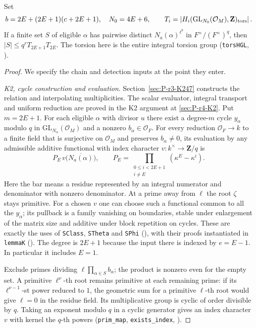 \begin{proposition}\label{prop:P-k-few}
Set
\[
 b=2E+(2E+1)(c+2E+1),\quad N_0=4E+6,\qquad
 T_i=\left|H_i(\mathrm{GL}_{N_0}(\mathcal O_M),\mathbf Z)_{\rm tors}\right|.
\]
If a finite set $S$ of eligible $\alpha$ has pairwise distinct
$N_a(\alpha)^{\ell^b}$ in $F^\times/(F^\times)^q$, then
$|S|\le q^r T_{2E+1}T_{2E}$. The torsion here is the entire integral
torsion group (\nolinkurl{torsHGL}, ).
\end{proposition}
\begin{proof}
We specify the chain and detection inputs at the point they enter.

\emph{K2, cycle construction and evaluation.} Section~\ref{sec:P-r3-K247} constructs the relation and interpolating multiplicities. The scalar evaluator, integral transport and uniform reduction are proved in the K2 argument at \ref{sec:P-r4-K2}.
Put $m=2E+1$. For each eligible $\alpha$ with divisor $u$ there
exist a degree-$m$ cycle $y_\alpha$ modulo $q$ in
$\mathrm{GL}_{N_\alpha}(\mathcal O_M)$ and a nonzero
$b_\alpha\in\mathcal O_F$. For every reduction $\mathcal O_F\to k$ to a
finite field that is surjective on $\mathcal O_M$ and preserves
$b_\alpha\ne0$, its evaluation by any admissible additive functional
with index character $v:k^\times\to\mathbf Z/q$ is
\[
  P_E\,v\big(\overline{N_a(\alpha)}\big),\qquad
  P_E=\prod_{\substack{0\le i<2E+1\\ i\ne E}}
                   (\kappa^E-\kappa^i).
\]
Here the bar means a residue represented by an integral numerator and
denominator with nonzero denominator. At a prime away from $\ell$ the
root $\zeta$ stays primitive. For a chosen $v$ one can choose such a
functional common to all the $y_\alpha$; its pullback is a family
vanishing on boundaries, stable under enlargement of the matrix size and
additive under block repetition on cycles. These are exactly the uses of
\nolinkurl{SClass}, \nolinkurl{STheta} and \nolinkurl{SPhi}
(), with their proofs instantiated in
\nolinkurl{lemmaK} ().
The degree is $2E+1$ because the input there is indexed by $e=E-1$.
In particular it includes $E=1$.

Exclude primes dividing $\ell\prod_{\alpha\in S}b_\alpha$; the product
is nonzero even for the empty set. A primitive $\ell^\nu$-th root remains
primitive at each remaining prime: if its $\ell^{\nu-1}$-st power
reduced to $1$, the geometric sum for a primitive $\ell$-th root would
give $\ell=0$ in the residue field. Its multiplicative group is cyclic of
order divisible by $q$. Taking an exponent modulo $q$ in a cyclic
generator gives an index character $v$ with kernel the $q$-th powers
(\nolinkurl{prim_map}, \nolinkurl{exists_index},
).


\end{proof}
